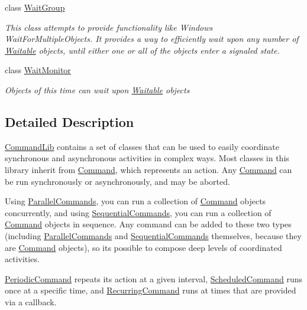 \begin{DoxyCompactItemize}
class \mbox{\hyperlink{class_command_lib_1_1_wait_group}{Wait\+Group}}
\begin{DoxyCompactList}\small\item\em This class attempts to provide functionality like Windows\textquotesingle{} Wait\+For\+Multiple\+Objects. It provides a way to efficiently wait upon any number of \mbox{\hyperlink{class_command_lib_1_1_waitable}{Waitable}} objects, until either one or all of the objects enter a signaled state. \end{DoxyCompactList}\item 
class \mbox{\hyperlink{class_command_lib_1_1_wait_monitor}{Wait\+Monitor}}
\begin{DoxyCompactList}\small\item\em Objects of this time can wait upon \mbox{\hyperlink{class_command_lib_1_1_waitable}{Waitable}} objects\end{DoxyCompactList}\end{DoxyCompactItemize}


\subsection{Detailed Description}
\mbox{\hyperlink{namespace_command_lib}{Command\+Lib}} contains a set of classes that can be used to easily coordinate synchronous and asynchronous activities in complex ways. Most classes in this library inherit from \mbox{\hyperlink{class_command_lib_1_1_command}{Command}}, which represents an action. Any \mbox{\hyperlink{class_command_lib_1_1_command}{Command}} can be run synchronously or asynchronously, and may be aborted. 

Using \mbox{\hyperlink{class_command_lib_1_1_parallel_commands}{Parallel\+Commands}}, you can run a collection of \mbox{\hyperlink{class_command_lib_1_1_command}{Command}} objects concurrently, and using \mbox{\hyperlink{class_command_lib_1_1_sequential_commands}{Sequential\+Commands}}, you can run a collection of \mbox{\hyperlink{class_command_lib_1_1_command}{Command}} objects in sequence. Any command can be added to these two types (including \mbox{\hyperlink{class_command_lib_1_1_parallel_commands}{Parallel\+Commands}} and \mbox{\hyperlink{class_command_lib_1_1_sequential_commands}{Sequential\+Commands}} themselves, because they are \mbox{\hyperlink{class_command_lib_1_1_command}{Command}} objects), so it\textquotesingle{}s possible to compose deep levels of coordinated activities. 

\mbox{\hyperlink{class_command_lib_1_1_periodic_command}{Periodic\+Command}} repeats its action at a given interval, \mbox{\hyperlink{class_command_lib_1_1_scheduled_command}{Scheduled\+Command}} runs once at a specific time, and \mbox{\hyperlink{class_command_lib_1_1_recurring_command}{Recurring\+Command}} runs at times that are provided via a callback. 

